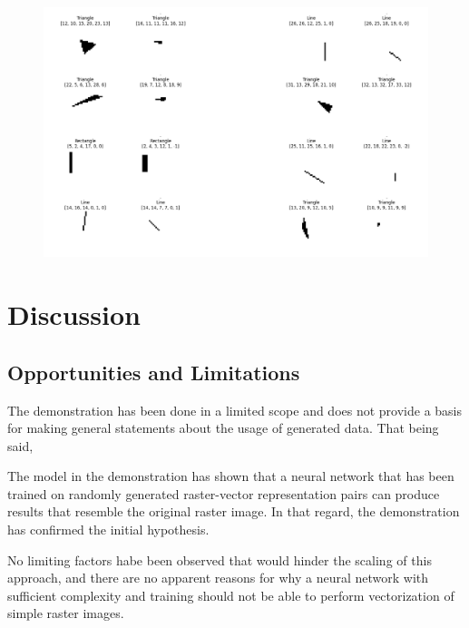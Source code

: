 \documentclass[12pt, a4paper, titlepage]{report}
\begin{document}
\begin{figure}[h]
   \includegraphics[width=1.0\textwidth]{../rc/images/all_shapes_approx_visual3.png}
   \label{fig:results_demonstration3}
\end{figure}





\chapter{Discussion}

\section{Opportunities and Limitations}

The demonstration has been done in a limited scope and does not provide a basis for making general statements about the usage of generated data. That being said, 

The model in the demonstration has shown that a neural network that has been trained on randomly generated raster-vector representation pairs can produce results that resemble the original raster image. In that regard, the demonstration has confirmed the initial hypothesis.

No limiting factors habe been observed that would hinder the scaling of this approach, and there are no apparent reasons for why a neural network with sufficient complexity and training should not be able to perform vectorization of simple raster images.
\end{document}
